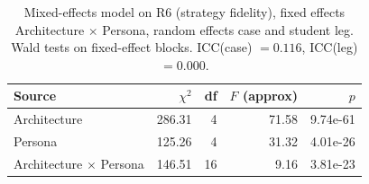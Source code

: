 \begin{table}[htbp]
\centering
\caption{Mixed-effects model on R6 (strategy fidelity), fixed effects Architecture $\times$ Persona, random effects case and student leg. Wald tests on fixed-effect blocks. ICC(case) $= 0.116$, ICC(leg) $= 0.000$.}
\label{tab:anova-R6}
\begin{tabular}{lrrrr}
\toprule
Source & $\chi^2$ & df & $F$ (approx) & $p$ \\
\midrule
Architecture & 286.31 & 4 & 71.58 & 9.74e-61 \\
Persona & 125.26 & 4 & 31.32 & 4.01e-26 \\
Architecture $\times$ Persona & 146.51 & 16 & 9.16 & 3.81e-23 \\
\bottomrule
\end{tabular}
\end{table}
